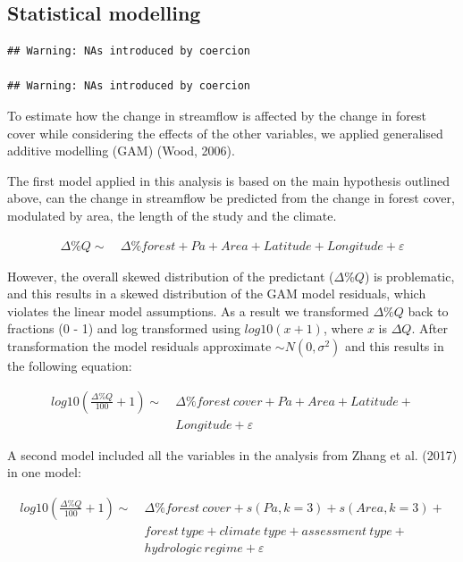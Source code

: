 \documentclass[]{elsarticle} %
\begin{document}
\hypertarget{statistical-modelling}{%
\subsection{Statistical modelling}\label{statistical-modelling}}

\begin{verbatim}
## Warning: NAs introduced by coercion

## Warning: NAs introduced by coercion
\end{verbatim}

To estimate how the change in streamflow is affected by the change in
forest cover while considering the effects of the other variables, we
applied generalised additive modelling (GAM) (Wood, 2006).

The first model applied in this analysis is based on the main hypothesis
outlined above, can the change in streamflow be predicted from the
change in forest cover, modulated by area, the length of the study and
the climate.

\[\tag{1}
\begin{aligned}
\Delta \%Q \sim ~&\Delta \%forest + Pa + Area + Latitude + Longitude + \varepsilon
\end{aligned}\]

However, the overall skewed distribution of the predictant
(\(\Delta \%Q\)) is problematic, and this results in a skewed
distribution of the GAM model residuals, which violates the linear model
assumptions. As a result we transformed \(\Delta \%Q\) back to fractions
(0 - 1) and log transformed using \(log10(x + 1)\), where \(x\) is
\(\Delta Q\). After transformation the model residuals approximate
\(\sim N(0,\sigma^2)\) and this results in the following equation:

\[\tag{2}
\begin{aligned}
log10(\frac{\Delta \% Q}{100} + 1) \sim ~ &\Delta \%{forest~cover}
+ Pa + Area + Latitude + 
\\ &Longitude + \varepsilon
\end{aligned}\]

A second model included all the variables in the analysis from Zhang et
al. (2017) in one model:

\[\tag{3}
\begin{aligned}
log10(\frac{\Delta \% Q}{100} + 1) \sim ~ &\Delta \% forest~cover + s(Pa, k = 3) + s(Area, k = 3) +  \\
& {forest~type} + {climate~type} + {assessment~type} + \\  
& {hydrologic~regime} + \varepsilon
\end{aligned}\]
\end{document}
